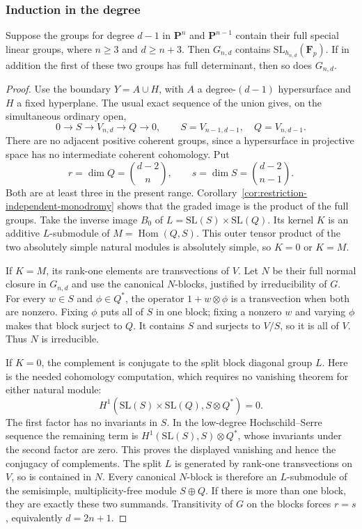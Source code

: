 \subsubsection{Induction in the degree}

\begin{proposition}\label{prop:pn-odd-degree-induction}
Suppose the groups for degree $d-1$ in $\mathbf P^n$ and
$\mathbf P^{n-1}$ contain their full special linear groups,
where $n\geq3$ and $d\geq n+3$.  Then
$G_{n,d}$ contains $\mathrm{SL}_{h_{n,d}}(\mathbf F_p)$.
If in addition the first of these two groups has full
determinant, then so does $G_{n,d}$.
\end{proposition}

\begin{proof}
Use the boundary $Y=A\cup H$, with $A$ a degree-$(d-1)$
hypersurface and $H$ a fixed hyperplane.  The usual exact
sequence of the union gives, on the simultaneous ordinary open,
\begin{equation}\label{eq:pn-two-piece-boundary}
 0\longrightarrow S\longrightarrow V_{n,d}
       \longrightarrow Q\longrightarrow0,
 \qquad
 S=V_{n-1,d-1},\quad Q=V_{n,d-1}.
\end{equation}
There are no adjacent positive coherent groups, since a
hypersurface in projective space has no intermediate coherent
cohomology.  Put
\[
 r=\dim Q=\binom{d-2}{n},\qquad
 s=\dim S=\binom{d-2}{n-1}.
\]
Both are at least three in the present range.
Corollary~\ref{cor:restriction-independent-monodromy} shows
that the graded image is the product of the full groups.
Take the inverse image $B_0$ of
$L=\mathrm{SL}(S)\times\mathrm{SL}(Q)$.
Its kernel $K$ is an additive $L$-submodule of
$M=\operatorname{Hom}(Q,S)$.  This outer tensor product of
the two absolutely simple natural modules is absolutely simple,
so $K=0$ or $K=M$.

If $K=M$, its rank-one elements are transvections of $V$.
Let $N$ be their full normal closure in $G_{n,d}$ and use
the canonical $N$-blocks, justified by irreducibility of $G$.
For every $w\in S$ and $\phi\in Q^*$, the operator
$1+w\otimes\phi$ is a transvection when both are nonzero.
Fixing $\phi$ puts all of $S$ in one block; fixing a nonzero
$w$ and varying $\phi$ makes that block surject to $Q$.
It contains $S$ and surjects to $V/S$, so it is all of $V$.
Thus $N$ is irreducible.

If $K=0$, the complement is conjugate to the split block
diagonal group $L$.  Here is the needed cohomology computation,
which requires no vanishing theorem for either natural module:
\[
 H^1(\mathrm{SL}(S)\times\mathrm{SL}(Q),S\otimes Q^*)=0.
\]
The first factor has no invariants in $S$.  In the low-degree
Hochschild--Serre sequence the remaining term is
$H^1(\mathrm{SL}(S),S)\otimes Q^*$, whose invariants under the
second factor are zero.  This proves the displayed vanishing
and hence the conjugacy of complements.
The split $L$ is generated by rank-one transvections on $V$,
so is contained in $N$.  Every canonical $N$-block is therefore
an $L$-submodule of the semisimple, multiplicity-free module
$S\oplus Q$.  If there is more than one block, they are exactly
these two summands.  Transitivity of $G$ on the blocks forces
$r=s$, equivalently $d=2n+1$.


\end{proof}

